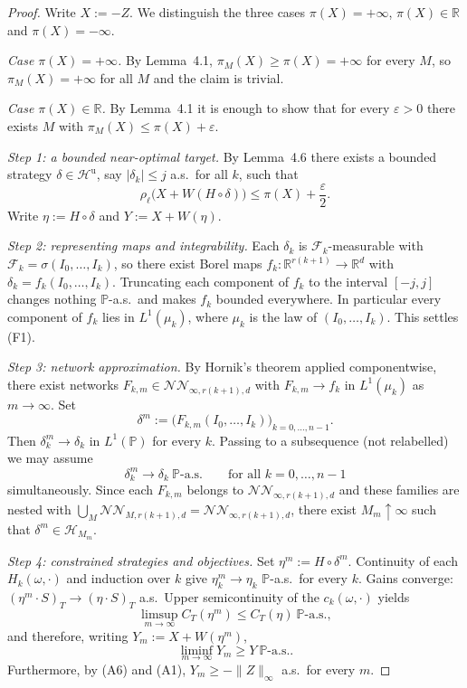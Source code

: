 \documentclass[11pt,a4paper]{report}
\numberwithin{equation}{chapter}
\theoremstyle{plain}
\theoremstyle{definition}
\newcommand{\PP}{\mathbb{P}}
\newcommand{\R}{\mathbb{R}}
\newcommand{\F}{\mathcal{F}}
\newcommand{\HH}{\mathcal{H}}
\newcommand{\Hu}{\mathcal{H}^{\mathrm{u}}}
\newcommand{\NNet}{\mathcal{N\!N}}
\newcommand{\as}{\ \PP\text{-a.s.}}
\begin{document}
\begin{proof}
  Write $X:=-Z$. We distinguish the three cases
  $\pi(X)=+\infty$, $\pi(X)\in\R$ and $\pi(X)=-\infty$.

  \textit{Case $\pi(X)=+\infty$.}
  By Lemma~4.1, $\pi_M(X)\ge\pi(X)=+\infty$ for every $M$, so
  $\pi_M(X)=+\infty$ for all $M$ and the claim is trivial.

  \textit{Case $\pi(X)\in\R$.}
  By Lemma~4.1 it is enough to show that for every $\varepsilon>0$
  there exists $M$ with $\pi_M(X)\le\pi(X)+\varepsilon$.

  \textit{Step 1: a bounded near-optimal target.}
  By Lemma~4.6 there exists a bounded strategy $\delta\in\Hu$, say
  $|\delta_k|\le j$ a.s.\ for all $k$, such that
  \[
    \rho_\ell\bigl(X+W(H\circ\delta)\bigr)\le\pi(X)+\frac{\varepsilon}{2}.
  \]
  Write $\eta:=H\circ\delta$ and $Y:=X+W(\eta)$.

  \textit{Step 2: representing maps and integrability.}
  Each $\delta_k$ is $\F_k$-measurable with
  $\F_k=\sigma(I_0,\dots,I_k)$, so there exist Borel maps
  $f_k:\R^{r(k+1)}\to\R^d$ with $\delta_k=f_k(I_0,\dots,I_k)$. Truncating
  each component of $f_k$ to the interval $[-j,j]$ changes nothing
  $\PP$-a.s.\ and makes $f_k$ bounded everywhere. In particular every
  component of $f_k$ lies
  in $L^1(\mu_k)$, where $\mu_k$ is the law of $(I_0,\dots,I_k)$. This
  settles (F1).

  \textit{Step 3: network approximation.}
  By Hornik's theorem applied componentwise, there exist networks
  $F_{k,m}\in\NNet_{\infty,r(k+1),d}$ with $F_{k,m}\to f_k$ in
  $L^1(\mu_k)$ as $m\to\infty$. Set
  \[
    \delta^m:=\bigl(F_{k,m}(I_0,\dots,I_k)\bigr)_{k=0,\dots,n-1}.
  \]
  Then $\delta^m_k\to\delta_k$ in $L^1(\PP)$ for every $k$. Passing to a
  subsequence (not relabelled) we may assume
  \[
    \delta^m_k\longrightarrow\delta_k\as\qquad\text{for all }k=0,\dots,n-1
  \]
  simultaneously. Since each $F_{k,m}$ belongs to $\NNet_{\infty,r(k+1),d}$
  and these families are nested with
  $\bigcup_M\NNet_{M,r(k+1),d}=\NNet_{\infty,r(k+1),d}$, there exist
  $M_m\uparrow\infty$ such that $\delta^m\in\HH_{M_m}$.

  \textit{Step 4: constrained strategies and objectives.}
  Set $\eta^m:=H\circ\delta^m$. Continuity of each $H_k(\omega,\cdot)$
  and induction over $k$ give $\eta^m_k\to\eta_k$ $\PP$-a.s.\ for every
  $k$. Gains converge: $(\eta^m\cdot S)_T\to(\eta\cdot S)_T$ a.s.\ Upper
  semicontinuity of the $c_k(\omega,\cdot)$ yields
  \[
    \limsup_{m\to\infty}C_T(\eta^m)\le C_T(\eta)\as,
  \]
  and therefore, writing $Y_m:=X+W(\eta^m)$,
  \[
    \liminf_{m\to\infty}Y_m\ge Y\as.
  \]
  Furthermore, by (A6) and (A1), $Y_m\ge-\|Z\|_\infty$ a.s.\ for every $m$.


\end{proof}
\end{document}
